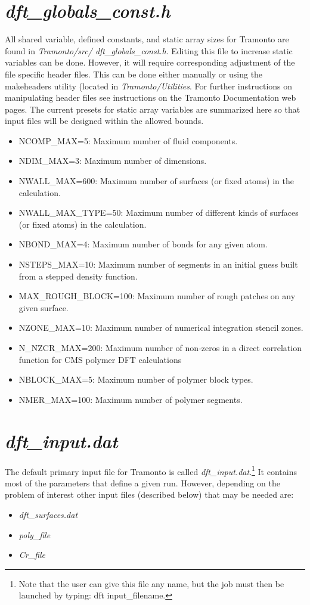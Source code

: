 \documentclass[10pt,onecolumn]{article}
\begin{document}
\section{{\it dft\_globals\_const.h}}
All shared variable, defined constants, and static array sizes for Tramonto are found in
{\it Tramonto/src/ dft\_globals\_const.h}.  Editing this file to increase static variables can be done.  However, it will require corresponding adjustment of the file specific header files.  This can be done either manually or using the makeheaders utility (located in {\it Tramonto/Utilities}.  For
further instructions on manipulating header files see instructions on the Tramonto Documentation
web pages.  The current presets for static array variables are summarized here so that input files will
be designed within the allowed bounds.
\begin{itemize}
\item{NCOMP\_MAX=5:  Maximum number of fluid components.}
\item{NDIM\_MAX=3: Maximum number of dimensions.}
\item{NWALL\_MAX=600: Maximum number of surfaces (or fixed atoms) in the calculation.}
\item{NWALL\_MAX\_TYPE=50: Maximum number of different kinds of surfaces (or fixed atoms) in the calculation.}
\item{NBOND\_MAX=4: Maximum number of bonds for any given atom.}
\item{NSTEPS\_MAX=10: Maximum number of segments in an initial guess built from a stepped density function.}
\item{MAX\_ROUGH\_BLOCK=100: Maximum number of rough patches on any given surface.}
\item{NZONE\_MAX=10: Maximum number of numerical integration stencil zones.}
\item{N\_NZCR\_MAX=200: Maximum number of non-zeros in a direct correlation function for CMS polymer DFT calculations}
\item{NBLOCK\_MAX=5: Maximum number of polymer block types.}
\item{NMER\_MAX=100: Maximum number of polymer segments.}
\end{itemize}

\vfill
\break
 
\section{{\it dft\_input.dat}}
\label{sec:input}
The default primary input file for Tramonto is called {\it dft\_input.dat}.\footnote{Note that the user can give this file any name, but the job must then be launched by typing:  dft input\_filename.}
It contains most of the parameters that define a given run.  However,
depending on the problem of interest other input files (described below) that may be needed are:
\begin{itemize}
\item{{\it dft\_surfaces.dat}}
\item{{\it poly\_file}}
\item{{\it Cr\_file}}
\end{itemize}
\end{document}
